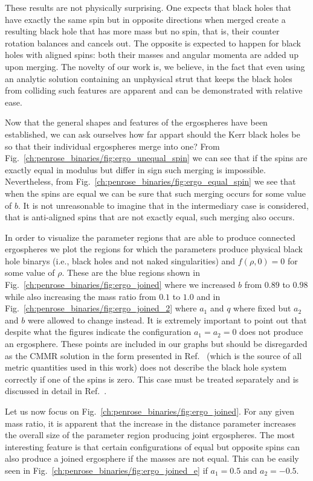 These results are not physically surprising. One expects that black holes that have exactly the same spin but in opposite directions when merged create a resulting black hole that has more mass but no spin, that is, their counter rotation balances and cancels out. The opposite is expected to happen for black holes with aligned spins: both their masses and angular momenta are added up upon merging. The novelty of our work is, we believe, in the fact that even using an analytic solution containing an unphysical strut that keeps the black holes from colliding such features are apparent and can be demonstrated with relative ease.

Now that the general shapes and features of the ergospheres have been established, we can ask ourselves how far appart should the Kerr black holes be so that their individual ergospheres merge into one? From Fig.~\ref{ch:penrose_binaries/fig:ergo_unequal_spin} we can see that if the spins are exactly equal in modulus but differ in sign such merging is impossible. Nevertheless, from Fig.~\ref{ch:penrose_binaries/fig:ergo_equal_spin} we see that when the spins are equal we can be sure that such merging occurs for some value of $b$. It is not unreasonable to imagine that in the intermediary case is considered, that is anti-aligned spins that are not exactly equal, such merging also occurs.

In order to visualize the parameter regions that are able to produce connected ergospheres we plot the regions for which the parameters produce physical black hole binarys (i.e., black holes and not naked singularities) and $f(\rho,0) = 0$ for some value of $\rho$. These are the blue regions shown in Fig.~\ref{ch:penrose_binaries/fig:ergo_joined} where we increased $b$ from $0.89$ to $0.98$ while also increasing the mass ratio from $0.1$ to $1.0$ and in Fig.~\ref{ch:penrose_binaries/fig:ergo_joined_2} where $a_1$ and $q$ where fixed but $a_2$ and $b$ were allowed to change instead. It is extremely important to point out that despite what the figures indicate the configuration $a_1=a_2=0$ does not produce an ergosphere. These points are included in our graphs but should be disregarded as the CMMR solution in the form presented in Ref.~\cite{MANKO2020} (which is the source of all metric quantities used in this work) does not describe the black hole system correctly if one of the spins is zero. This case must be treated separately and is discussed in detail in Ref.~\cite{MANKO2019}.

Let us now focus on Fig.~\ref{ch:penrose_binaries/fig:ergo_joined}. For any given mass ratio, it is apparent that the increase in the distance parameter increases the overall size of the parameter region producing joint ergospheres. The most interesting feature is that certain configurations of equal but opposite spins can also produce a joined ergosphere if the masses are not equal. This can be easily seen in Fig.~\ref{ch:penrose_binaries/fig:ergo_joined_e} if $a_1=0.5$ and $a_2=-0.5$.

